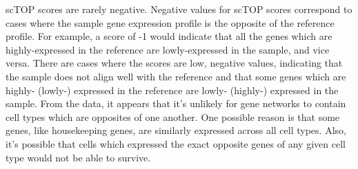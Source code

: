 \documentclass[12pt,american]{scrartcl}
\begin{document}
\begin{revresponse}
\begin{changes}
        scTOP scores are rarely negative. Negative values for scTOP scores correspond to cases where the sample gene expression profile is the opposite of the reference profile. For example, a score of -1 would indicate that all the genes which are highly-expressed in the reference are lowly-expressed in the sample, and vice versa. There are cases where the scores are low, negative values, indicating that the sample does not align well with the reference and that some genes which are highly- (lowly-) expressed in the reference are lowly- (highly-) expressed in the sample. From the data, it appears that it’s unlikely for gene networks to contain cell types which are opposites of one another. One possible reason is that some genes, like housekeeping genes, are similarly expressed across all cell types. Also, it’s possible that cells which expressed the exact opposite genes of any given cell type would not be able to survive.
    \end{changes}
\end{revresponse}
\end{document}
